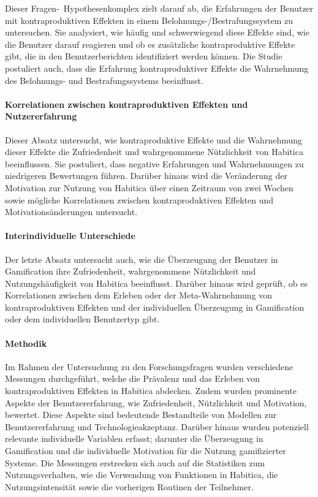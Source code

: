 \documentclass[sigconf, nonacm]{acmart}
\begin{document}
Dieser Fragen-\ Hypothesenkomplex zielt darauf ab, die Erfahrungen der Benutzer mit kontraproduktiven Effekten in einem Belohnungs-/Bestrafungssystem zu untersuchen. Sie analysiert, wie häufig und schwerwiegend diese Effekte sind, wie die Benutzer darauf reagieren und ob es zusätzliche kontraproduktive Effekte gibt, die in den Benutzerberichten identifiziert werden können. Die Studie postuliert auch, dass die Erfahrung kontraproduktiver Effekte die Wahrnehmung des Belohnungs- und Bestrafungssystems beeinflusst.

\paragraph{Korrelationen zwischen kontraproduktiven Effekten und Nutzererfahrung}

Dieser Absatz untersucht, wie kontraproduktive Effekte und die Wahrnehmung dieser Effekte die Zufriedenheit und wahrgenommene Nützlichkeit von Habitica beeinflussen. Sie postuliert, dass negative Erfahrungen und Wahrnehmungen zu niedrigeren Bewertungen führen. Darüber hinaus wird die Veränderung der Motivation zur Nutzung von Habitica über einen Zeitraum von zwei Wochen sowie mögliche Korrelationen zwischen kontraproduktiven Effekten und Motivationsänderungen untersucht.

\paragraph{Interindividuelle Unterschiede}

Der letzte Absatz untersucht auch, wie die Überzeugung der Benutzer in Gamification ihre Zufriedenheit, wahrgenommene Nützlichkeit und Nutzungshäufigkeit von Habitica beeinflusst. Darüber hinaus wird geprüft, ob es Korrelationen zwischen dem Erleben oder der Meta-Wahrnehmung von kontraproduktiven Effekten und der individuellen Überzeugung in Gamification oder dem individuellen Benutzertyp gibt.

\paragraph{Methodik}
Im Rahmen der Untersuchung zu den Forschungsfragen wurden verschiedene Messungen durchgeführt, welche die Prävalenz und das Erleben von kontraproduktiven Effekten in Habitica abdecken. Zudem wurden prominente Aspekte der Benutzererfahrung, wie Zufriedenheit, Nützlichkeit und Motivation, bewertet. Diese Aspekte sind bedeutende Bestandteile von Modellen zur Benutzererfahrung und Technologieakzeptanz.
Darüber hinaus wurden potenziell relevante individuelle Variablen erfasst; darunter die Überzeugung in Gamification und die individuelle Motivation für die Nutzung gamifizierter Systeme. Die Messungen erstrecken sich auch auf die Statistiken zum Nutzungsverhalten, wie die Verwendung von Funktionen in Habitica, die Nutzungsintensität sowie die vorherigen Routinen der Teilnehmer.
\end{document}
